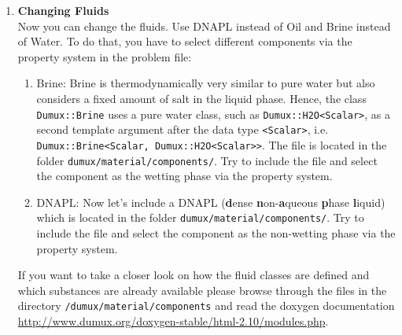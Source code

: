\begin{enumerate}
\item \textbf{Changing Fluids} \\
Now you can change the fluids. Use DNAPL instead of Oil and Brine instead of Water.
To do that, you have to select different components via the property system in the problem file:
\begin{enumerate}
 \item Brine: Brine is thermodynamically very similar to pure water but also
 considers a fixed amount of salt in the liquid phase.
  Hence, the class \texttt{Dumux::Brine} uses a pure water class, such as \texttt{Dumux::H2O<Scalar>},
  as a second template argument after the data type \texttt{<Scalar>}, i.e.
  \texttt{Dumux::Brine<Scalar, Dumux::H2O<Scalar>>}. The file is located in the folder \texttt{dumux/material/components/}.
  Try to include the file and select the component as the wetting phase via the property system.
 \item DNAPL:
  Now let's include a DNAPL (\textbf{d}ense \textbf{n}on-\textbf{a}queous \textbf{p}hase \textbf{l}iquid)
  which is located in the folder \texttt{dumux/material/components/}. Try to
  include the file and select the component as the non-wetting phase via the property system.
\end{enumerate}
If you want to take a closer look on how the fluid classes are defined and which
substances are already available please browse through the files in the directory
\texttt{/dumux/material/components} and read 
the doxygen documentation \url{http://www.dumux.org/doxygen-stable/html-2.10/modules.php}.


\end{enumerate}
